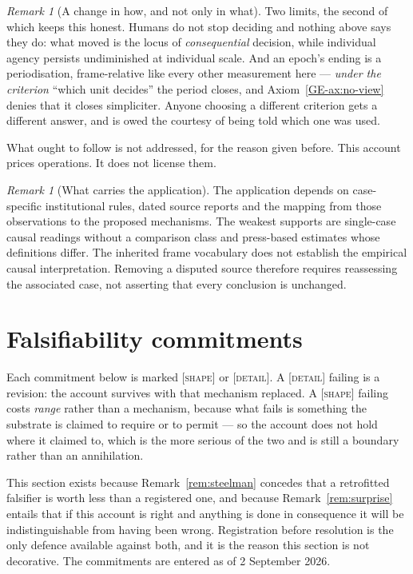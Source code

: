 \documentclass[11pt,a4paper]{article}
\theoremstyle{remark}
\newtheorem{remark}[definition]{Remark}
\begin{document}
\begin{remark}[A change in how, and not only in what]
Two limits, the second of which keeps this honest. Humans do not stop deciding and nothing above
says they do: what moved is the locus of \emph{consequential} decision, while individual agency persists
undiminished at individual scale. And an epoch's ending is a periodisation, frame-relative like every
other measurement here --- \emph{under the criterion} ``which unit decides'' the period closes, and
Axiom~\ref{GE-ax:no-view} denies that it closes simpliciter. Anyone choosing a different criterion gets a different
answer, and is owed the courtesy of being told which one was used.

What ought to follow is not addressed, for the reason given before. This account prices
operations. It does not license them.
\end{remark}

\begin{remark}[What carries the application]\label{rem:weight}
The application depends on case-specific institutional rules, dated source
reports and the mapping from those observations to the proposed mechanisms.
The weakest supports are single-case causal readings without a comparison
class and press-based estimates whose definitions differ. The inherited
frame vocabulary does not establish the empirical causal interpretation.
Removing a disputed source therefore requires reassessing the associated
case, not asserting that every conclusion is unchanged.
\end{remark}

\section{Falsifiability commitments}\label{sec:falsifiability}
Each commitment below is marked \textsc{[shape]} or \textsc{[detail]}. A \textsc{[detail]} failing is a
revision: the account survives with that mechanism replaced. A \textsc{[shape]} failing costs \emph{range}
rather than a mechanism, because what fails is something the substrate is claimed to require or to permit
--- so the account does not hold where it claimed to, which is the more serious of the two and is still a
boundary rather than an annihilation.

This section exists because Remark~\ref{rem:steelman} concedes that a retrofitted falsifier is worth less
than a registered one, and because Remark~\ref{rem:surprise} entails that if this account is right and
anything is done in consequence it will be indistinguishable from having been wrong. Registration before
resolution is the only defence available against both, and it is the reason this section is not
decorative. The commitments are entered as of 2 September 2026.
\end{document}
